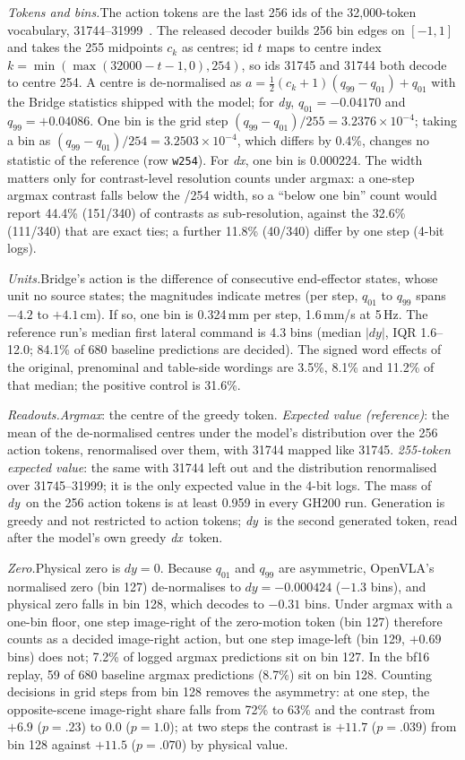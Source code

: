 \documentclass[conference]{IEEEtran}
\newcommand{\dy}{\textit{dy}}
\newcommand{\dx}{\textit{dx}}
\newcommand{\rowid}[1]{\texttt{#1}}
\newcommand{\head}[1]{\textit{#1}\hspace{0.4em}}
\begin{document}
\head{Tokens and bins.}The action tokens are the last 256 ids of the 32,000-token vocabulary, 31744--31999~\cite{kim2024openvla}. The released decoder builds 256 bin edges on $[-1,1]$ and takes the 255 midpoints $c_k$ as centres; id $t$ maps to centre index $k=\min(\max(32000-t-1,0),254)$, so ids 31745 and 31744 both decode to centre 254. A centre is de-normalised as $a=\tfrac12(c_k+1)(q_{99}-q_{01})+q_{01}$ with the Bridge statistics shipped with the model; for \dy, $q_{01}=-0.04170$ and $q_{99}=+0.04086$. One bin is the grid step $(q_{99}-q_{01})/255=3.2376\times10^{-4}$; taking a bin as $(q_{99}-q_{01})/254=3.2503\times10^{-4}$, which differs by 0.4\%, changes no statistic of the reference (row \rowid{w254}). For \dx, one bin is 0.000224. The width matters only for contrast-level resolution counts under argmax: a one-step argmax contrast falls below the /254 width, so a ``below one bin'' count would report 44.4\% (151/340) of contrasts as sub-resolution, against the 32.6\% (111/340) that are exact ties; a further 11.8\% (40/340) differ by one step (4-bit logs).

\head{Units.}Bridge's action is the difference of consecutive end-effector states, whose unit no source states; the magnitudes indicate metres (per step, $q_{01}$ to $q_{99}$ spans $-4.2$ to $+4.1$\,cm). If so, one bin is 0.324\,mm per step, 1.6\,mm/s at 5\,Hz. The reference run's median first lateral command is 4.3 bins (median $|\dy|$, IQR 1.6--12.0; 84.1\% of 680 baseline predictions are decided). The signed word effects of the original, prenominal and table-side wordings are 3.5\%, 8.1\% and 11.2\% of that median; the positive control is 31.6\%.

\head{Readouts.}\emph{Argmax}: the centre of the greedy token. \emph{Expected value (reference)}: the mean of the de-normalised centres under the model's distribution over the 256 action tokens, renormalised over them, with 31744 mapped like 31745. \emph{255-token expected value}: the same with 31744 left out and the distribution renormalised over 31745--31999; it is the only expected value in the 4-bit logs. The mass of \dy\ on the 256 action tokens is at least 0.959 in every GH200 run. Generation is greedy and not restricted to action tokens; \dy\ is the second generated token, read after the model's own greedy \dx\ token.

\head{Zero.}Physical zero is $\dy=0$. Because $q_{01}$ and $q_{99}$ are asymmetric, OpenVLA's normalised zero (bin 127) de-normalises to $\dy=-0.000424$ ($-1.3$ bins), and physical zero falls in bin 128, which decodes to $-0.31$ bins. Under argmax with a one-bin floor, one step image-right of the zero-motion token (bin 127) therefore counts as a decided image-right action, but one step image-left (bin 129, $+0.69$ bins) does not; 7.2\% of logged argmax predictions sit on bin 127. In the bf16 replay, 59 of 680 baseline argmax predictions (8.7\%) sit on bin 128. Counting decisions in grid steps from bin 128 removes the asymmetry: at one step, the opposite-scene image-right share falls from 72\% to 63\% and the contrast from $+6.9$ ($p=.23$) to 0.0 ($p=1.0$); at two steps the contrast is $+11.7$ ($p=.039$) from bin 128 against $+11.5$ ($p=.070$) by physical value.
\end{document}
